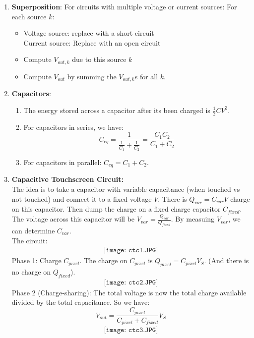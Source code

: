 \documentclass[10pt]{article}
\begin{document}
\begin{multicols}{2}
\begin{enumerate}
    \item \textbf{Superposition}: For circuits with multiple voltage or current sources: For each source $k$:
    \begin{itemize}
        \item 
            Voltage source: replace with a short circuit \\
            Current source: Replace with an open circuit

        \item Compute $V_{out,k}$ due to this source $k$
        \item Compute $V_{out}$ by summing the $V_{out,k}$s for all $k$.
    \end{itemize}
    
    \item \textbf{Capacitors}:\\
    \begin{enumerate}
        \item The energy stored across a capacitor after its been charged is $\frac{1}{2}CV^2$.
        \item For capacitors in series, we have: $$C_{eq}=\dfrac{1}{\frac{1}{C_1} + \frac{1}{C_2}} = \dfrac{C_1C_2}{C_1+C_2}$$
        \item For capacitors in parallel: $C_{eq} = C_1 + C_2$.
    \end{enumerate}
    
    \item \textbf{Capacitive Touchscreen Circuit:} \\
    The idea is to take a capacitor with variable capacitance (when touched vs not touched) and connect it to a fixed voltage $V$. There is $Q_{var}=C_{var}V$ charge on this capacitor. Then dump the charge on a fixed charge capacitor $C_{fixed}$. The voltage across this capacitor will be $V_{var}=\frac{Q_{var}}{Q_{fixed}}$. By measuing $V_{var}$, we can determine $C_{var}$. \\ The circuit:
    \begin{align*}
        \texttt{[image: ctc1.JPG]}
     \end{align*}
    Phase 1: Charge $C_{pixel}$. The charge on $C_{pixel}$ is $Q_{pixel}=C_{pixel}V_S$. (And there is no charge on $Q_{fixed}$).
    \begin{align*}
        \texttt{[image: ctc2.JPG]}
     \end{align*}
    Phase 2 (Charge-sharing): 
    The total voltage is now the total charge available divided by the total capacitance. So we have: 
    \begin{equation*}
        V_{out}=\frac{C_{pixel}}{C_{pixel}+C_{fixed}}V_S
    \end{equation*}
    \begin{align*}
        \texttt{[image: ctc3.JPG]}
     \end{align*}


\end{enumerate}
\end{multicols}
\end{document}
